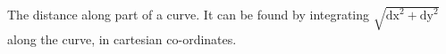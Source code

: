 The distance along part of a curve. It can be found by integrating
$ \sqrt {\mathrm{dx}^2 + \mathrm{dy}^2} $ along the curve, in
cartesian co-ordinates.